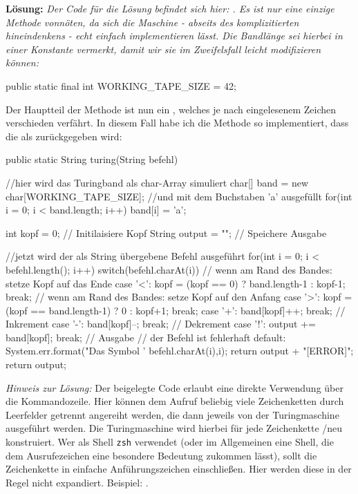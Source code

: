\documentclass[table]{sopra-base}
\makeatletter
\let\T\texttt
\def\pc{\noexpand\rotatebox[origin=c]{270}{\noexpand\faPaperclip{}}}
\def\aTask#1#2{\attachDocumentText{#1/#2}{\pc{} \noexpand\detokenize{#2}}}
\newenvironment{solution}{\null\par\noindent\textbf{\textcolor{sob@col@uulm@cs}{Lösung:}}\newline\bgroup\color{black}\slshape\ignorespaces}{\egroup}
\makeatother
\begin{document}
\begin{solution}
    Der Code für die Lösung befindet sich hier: \aTask{middle}{A31_Turing.java}. Es ist nur eine einzige Methode vonnöten, da sich die Maschine - abseits des komplizitierten hineindenkens - echt einfach implementieren lässt. Die Bandlänge sei hierbei in einer Konstante vermerkt, damit wir sie im Zweifelsfall leicht modifizieren können:
{\upshape
\begin{java*}[morekeywords={[4]{WORKING_TAPE_SIZE}}]
public static final int WORKING_TAPE_SIZE = 42;
\end{java*}
}
     Der Hauptteil der Methode  ist nun ein , welches je nach eingelesenem Zeichen verschieden verfährt. In diesem Fall habe ich die Methode so implementiert, dass die  als  zurückgegeben wird:
{\upshape
\begin{java}[firstnumber=35,morekeywords={[4]{WORKING_TAPE_SIZE}}]
public static String turing(String befehl) {
    //hier wird das Turingband als char-Array simuliert
    char[] band = new char[WORKING_TAPE_SIZE];
    //und mit dem Buchstaben 'a' ausgefüllt
    for(int i = 0; i < band.length; i++)
        band[i] = 'a';
        
    int kopf = 0; // Initilaisiere Kopf
    String output = ""; // Speichere Ausgabe

    //jetzt wird der als String übergebene Befehl ausgeführt
    for(int i = 0; i < befehl.length(); i++){
        switch(befehl.charAt(i)){
            // wenn am Rand des Bandes: stetze Kopf auf das Ende
            case '<': kopf = (kopf == 0) ? band.length-1 : kopf-1; break;
            // wenn am Rand des Bandes: setze Kopf auf den Anfang
            case '>': kopf = (kopf == band.length-1) ? 0 : kopf+1; break;
            case '+': band[kopf]++; break; // Inkrement
            case '-': band[kopf]--; break; // Dekrement
            case '!': output += band[kopf]; break; // Ausgabe
            // der Befehl ist fehlerhaft
            default: 
                System.err.format("Das Symbol '%
                    befehl.charAt(i),i); 
                return output + "[ERROR]";
        }
    }
    return output;
}
\end{java}
}
\textit{Hinweis zur Lösung:} Der beigelegte Code erlaubt eine direkte Verwendung über die Kommandozeile. Hier können dem Aufruf  beliebig viele Zeichenketten durch Leerfelder getrennt angereiht werden, die dann jeweils von der Turingmaschine ausgeführt werden. Die Turingmaschine wird hierbei für jede Zeichenkette /neu konstruiert. Wer als Shell \T{zsh} verwendet (oder im Allgemeinen eine Shell, die dem Ausrufezeichen eine besondere Bedeutung zukommen lässt), sollt die Zeichenkette in einfache Anführungszeichen einschließen. Hier werden diese in der Regel nicht expandiert. Beispiel: .
\end{solution}
\end{document}
